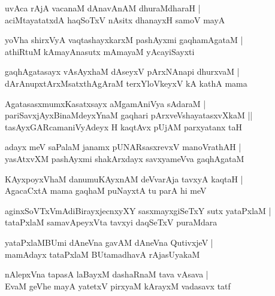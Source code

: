 \begin{shloka}
uvAca rAjA vacanaM dAnavAnAM dhuraMdharaH |\\
aciMtayatatxdA haqSoTxV nAsitx dhanayxH samoV mayA
\end{shloka}

\begin{shloka}
yoVha shirxVyA vaqtashayxkarxM pashAyxmi gaqhamAgataM |\\
athiRtuM kAmayAnasutx mAmayaM yAcayiSayxti
\end{shloka}

\begin{shloka}
gaqhAgatasayx vAsAyxhaM dAseyxV pArxNAnapi dhurxvaM |\\
dArAnupxtArxMsatxthAgAraM terxYloVkeyxV kA kathA mama
\end{shloka}

\begin{shloka}
AgatasasxmumxKasatxsayx aMgamAniVya sAdaraM |\\
pariSavxjAyxBinaMdeyxYnaM gaqhari pArxveVshayatasxvXkaM ||\\
tasAyxGARcamaniVyAdeyx H kaqtAvx pUjAM parxyatanx taH 
\end{shloka}

\begin{shloka}
adayx meV saPalaM janamx pUNARsasxrevxV manoVrathAH |\\
yasAtxvXM pashAyxmi shakArxdayx savxyameVva gaqhAgataM
\end{shloka}

\begin{shloka}
KAyxpoyxVhaM danumuKAyxnAM deVvarAja tavxyA kaqtaH |\\
AgacaCxtA mama gaqhaM puNayxtA tu parA hi meV
\end{shloka}

\begin{shloka}
aginxSoVTxVmAdiBirayxjecnxyXY sasxmayxgiSeTxY sutx yataPxlaM |\\
tataPxlaM samavApeyxVta tavxyi daqSeTxV puraMdara
\end{shloka}

\begin{shloka}
yataPxlaMBUmi dAneVna gavAM dAneVna QutivxjeV |\\
mamAdayx tataPxlaM BUtamadhavA rAjasUyakaM 
\end{shloka}

\begin{shloka}
nAlepxVna tapasA laBayxM dashaRnaM tava vAsava |\\
EvaM geVhe mayA yatetxV pirxyaM kArayxM vadasavx tatf
\end{shloka}

